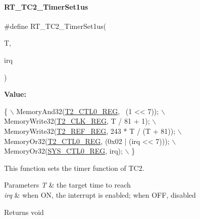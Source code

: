\paragraph{\texorpdfstring{R\+T\+\_\+\+T\+C2\+\_\+\+Timer\+Set1us}{RT\_TC2\_TimerSet1us}}
{\footnotesize\ttfamily \#define R\+T\+\_\+\+T\+C2\+\_\+\+Timer\+Set1us(\begin{DoxyParamCaption}\item[{}]{T,  }\item[{}]{irq }\end{DoxyParamCaption})}

{\bfseries Value\+:}
\begin{DoxyCode}
\{                                                  \(\backslash\)
        MemoryAnd32(\mbox{\hyperlink{a00020_adadaa0ab1ebbd7ba9b70dfd24c3ed44daf2e9deb36631241181cbf09e8d959475}{T2\_CTL0\_REG}}, ~(1 << 7));           \(\backslash\)
        MemoryWrite32(\mbox{\hyperlink{a00020_adadaa0ab1ebbd7ba9b70dfd24c3ed44dab67d86aa158825e559813e0df3f74cc6}{T2\_CLK\_REG}}, T / 81 + 1);             \(\backslash\)
        MemoryWrite32(\mbox{\hyperlink{a00020_adadaa0ab1ebbd7ba9b70dfd24c3ed44da840de759e5083c864ed1c57dad568251}{T2\_REF\_REG}}, 243 * T / (T + 81)); \(\backslash\)
        MemoryOr32(\mbox{\hyperlink{a00020_adadaa0ab1ebbd7ba9b70dfd24c3ed44daf2e9deb36631241181cbf09e8d959475}{T2\_CTL0\_REG}}, (0x02 | (irq << 7)));  \(\backslash\)
        MemoryOr32(\mbox{\hyperlink{a00020_adadaa0ab1ebbd7ba9b70dfd24c3ed44dab61d9968d782d6c00e9de838e38913f5}{SYS\_CTL0\_REG}}, irq);                 \(\backslash\)
    \}
\end{DoxyCode}


This function sets the timer function of T\+C2. 


\begin{DoxyParams}{Parameters}
{\em T} & the target time to reach \\
\hline
{\em irq} & when ON, the interrupt is enabled; when O\+FF, disabled \\
\hline
\end{DoxyParams}
\begin{DoxyReturn}{Returns}
void 
\end{DoxyReturn}
